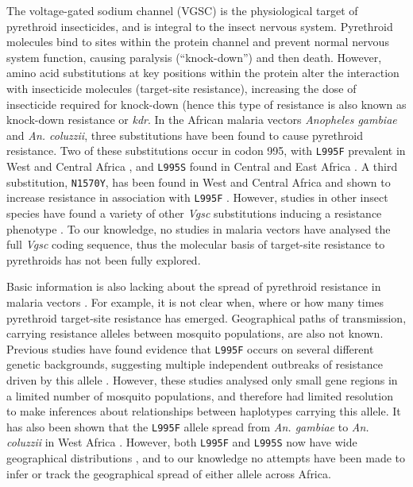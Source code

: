 \documentclass[a4paper,11pt,abstracton,hidelinks]{scrartcl}
\begin{document}
The voltage-gated sodium channel (VGSC) is the physiological target of pyrethroid insecticides, and is integral to the insect nervous system.
%
Pyrethroid molecules bind to sites within the protein channel and prevent normal nervous system function, causing paralysis (``knock-down'') and then death.
%
However, amino acid substitutions at key positions within the protein alter the interaction with insecticide molecules (target-site resistance), increasing the dose of insecticide required for knock-down (hence this type of resistance is also known as knock-down resistance or \textit{kdr}\cite{Davies2007a,Dong2014}.
%
In the African malaria vectors \textit{Anopheles gambiae} and \textit{An. coluzzii}, three substitutions have been found to cause pyrethroid resistance.
%
Two of these substitutions occur in codon 995\footnotemark, with \texttt{L995F} prevalent in West and Central Africa \cite{Martinez-Torres1998,Silva2014}, and \texttt{L995S} found in Central and East Africa \cite{Ranson2000,Silva2014}.
%
A third substitution, \texttt{N1570Y}, has been found in West and Central Africa and shown to increase resistance in association with \texttt{L995F} \cite{Jones2012}.
%
However, studies in other insect species have found a variety of other \emph{Vgsc} substitutions inducing a resistance phenotype \cite{Davies2007b,Rinkevich2013,Dong2014}.
%
To our knowledge, no studies in malaria vectors have analysed the full \emph{Vgsc} coding sequence, thus the molecular basis of target-site resistance to pyrethroids has not been fully explored.


Basic information is also lacking about the spread of pyrethroid resistance in malaria vectors \cite{WorldHealthOrganization2012}.
%
For example, it is not clear when, where or how many times pyrethroid target-site resistance has emerged.
%
Geographical paths of transmission, carrying resistance alleles between mosquito populations, are also not known.
%
Previous studies have found evidence that \texttt{L995F} occurs on several different genetic backgrounds, suggesting multiple independent outbreaks of resistance driven by this allele \cite{Pinto2007,Etang2009,Lynd2010,Santolamazza2015}.
%
However, these studies analysed only small gene regions in a limited number of mosquito populations, and therefore had limited resolution to make inferences about relationships between haplotypes carrying this allele.
%
It has also been shown that the \texttt{L995F} allele spread from \textit{An. gambiae} to \textit{An. coluzzii} in West Africa \cite{weill2000,diabate2004,Clarkson2014,Norris2015}.
%
However, both \texttt{L995F} and \texttt{L995S} now have wide geographical distributions \cite{Silva2014}, and to our knowledge no attempts have been made to infer or track the geographical spread of either allele across Africa.
\end{document}
